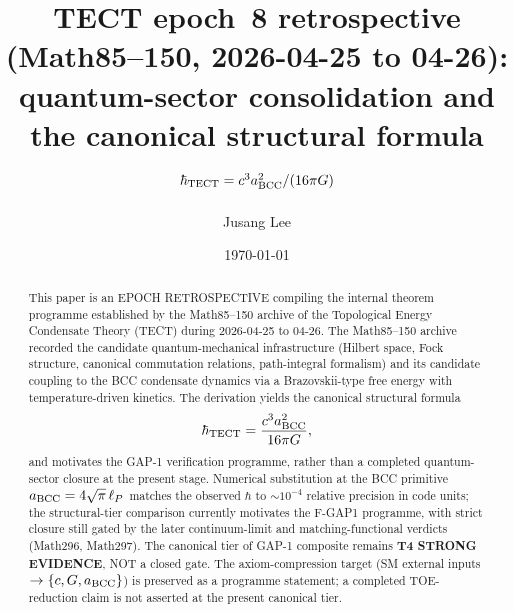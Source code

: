



\title{TECT epoch~8 retrospective (Math85--150, 2026-04-25 to 04-26):
quantum-sector consolidation and the canonical structural formula
$\hbar_{\rm TECT} = c^3 a_{\rm BCC}^2 / (16\pi G)$}

\author{Jusang Lee}

\date{\today}

\begin{abstract}
This paper is an EPOCH RETROSPECTIVE compiling the internal theorem
programme established by the Math85--150 archive of the Topological
Energy Condensate Theory (TECT) during 2026-04-25 to 04-26. The
Math85--150 archive recorded the candidate quantum-mechanical
infrastructure (Hilbert space, Fock structure, canonical commutation
relations, path-integral formalism) and its candidate coupling to the
BCC condensate dynamics via a Brazovskii-type free energy with
temperature-driven kinetics. The derivation yields the canonical
structural formula
\[
\hbar_{\rm TECT} = \frac{c^3 a_{\rm BCC}^2}{16\pi G},
\]
and motivates the GAP-1 verification programme, rather than a
completed quantum-sector closure at the present stage. Numerical
substitution at the BCC primitive $a_{\rm BCC} = 4\sqrt{\pi}\,\ell_P$
matches the observed $\hbar$ to $\sim 10^{-4}$ relative precision in
code units; the structural-tier comparison currently motivates the
F-GAP1 programme, with strict closure still gated by the later
continuum-limit and matching-functional verdicts (Math296, Math297).
The canonical tier of GAP-1 composite remains \textbf{T4 STRONG
EVIDENCE}, NOT a closed gate. The axiom-compression target
(SM external inputs $\to \{c, G, a_{\rm BCC}\}$) is preserved as a
programme statement; a completed TOE-reduction claim is not asserted
at the present canonical tier.
\end{abstract}

